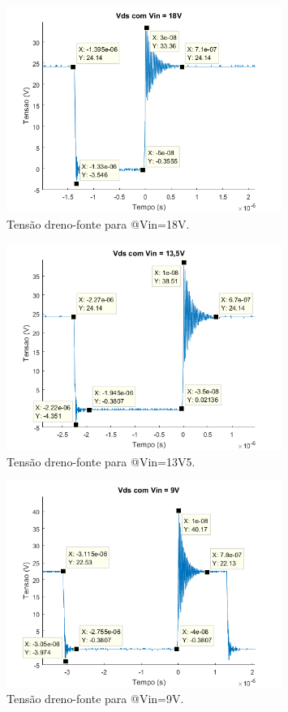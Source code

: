 \documentclass[a4paper]{article}
\begin{document}
{\begin{figure}[H]
	\centering
	\includegraphics[width=0.8\textwidth]{vds-18V.png}
	\caption{Tensão dreno-fonte para @Vin=18V.}
	\label{fig:vds-18V}
\end{figure}

\begin{figure}[H]
	\centering
	\includegraphics[width=0.8\textwidth]{vds-13V5.png}
	\caption{Tensão dreno-fonte para @Vin=13V5.}
	\label{fig:vds-13V5}
\end{figure}

\begin{figure}[H]
	\centering
	\includegraphics[width=0.8\textwidth]{vds-9V.png}
	\caption{Tensão dreno-fonte para @Vin=9V.}
	\label{fig:vds-9V}
\end{figure}


}
\end{document}
